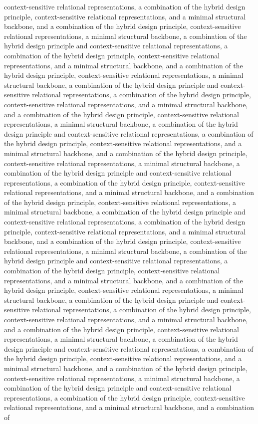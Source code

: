 context-sensitive relational representations, a combination of the hybrid design principle, context-sensitive relational representations, and a minimal structural backbone, and a combination of the hybrid design principle, context-sensitive relational representations, a minimal structural backbone, a combination of the hybrid design principle and context-sensitive relational representations, a combination of the hybrid design principle, context-sensitive relational representations, and a minimal structural backbone, and a combination of the hybrid design principle, context-sensitive relational representations, a minimal structural backbone, a combination of the hybrid design principle and context-sensitive relational representations, a combination of the hybrid design principle, context-sensitive relational representations, and a minimal structural backbone, and a combination of the hybrid design principle, context-sensitive relational representations, a minimal structural backbone, a combination of the hybrid design principle and context-sensitive relational representations, a combination of the hybrid design principle, context-sensitive relational representations, and a minimal structural backbone, and a combination of the hybrid design principle, context-sensitive relational representations, a minimal structural backbone, a combination of the hybrid design principle and context-sensitive relational representations, a combination of the hybrid design principle, context-sensitive relational representations, and a minimal structural backbone, and a combination of the hybrid design principle, context-sensitive relational representations, a minimal structural backbone, a combination of the hybrid design principle and context-sensitive relational representations, a combination of the hybrid design principle, context-sensitive relational representations, and a minimal structural backbone, and a combination of the hybrid design principle, context-sensitive relational representations, a minimal structural backbone, a combination of the hybrid design principle and context-sensitive relational representations, a combination of the hybrid design principle, context-sensitive relational representations, and a minimal structural backbone, and a combination of the hybrid design principle, context-sensitive relational representations, a minimal structural backbone, a combination of the hybrid design principle and context-sensitive relational representations, a combination of the hybrid design principle, context-sensitive relational representations, and a minimal structural backbone, and a combination of the hybrid design principle, context-sensitive relational representations, a minimal structural backbone, a combination of the hybrid design principle and context-sensitive relational representations, a combination of the hybrid design principle, context-sensitive relational representations, and a minimal structural backbone, and a combination of the hybrid design principle, context-sensitive relational representations, a minimal structural backbone, a combination of the hybrid design principle and context-sensitive relational representations, a combination of the hybrid design principle, context-sensitive relational representations, and a minimal structural backbone, and a combination of 